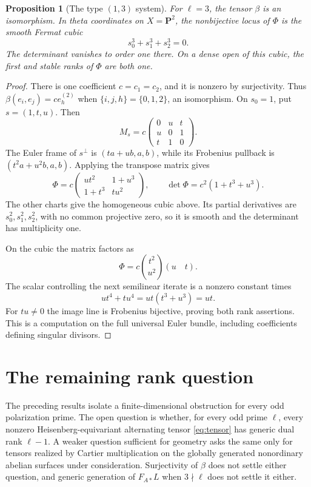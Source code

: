 \documentclass[11pt]{article}
\newtheorem{proposition}[theorem]{Proposition}
\theoremstyle{definition}\newtheorem{definition}[theorem]{Definition}
\theoremstyle{remark}\newtheorem{remark}[theorem]{Remark}
\newcommand{\PP}{\mathbf P}
\begin{document}
\begin{proposition}[The type $(1,3)$ system]\label{prop:cubic}
For $\ell=3$, the tensor $\beta$ is an isomorphism. In theta coordinates on $X=\PP^2$, the nonbijective locus of $\Phi$ is the smooth Fermat cubic
\[
 s_0^3+s_1^3+s_2^3=0.
\]
The determinant vanishes to order one there. On a dense open of this cubic, the first and stable ranks of $\Phi$ are both one.
\end{proposition}
\begin{proof}
There is one coefficient $c=c_1=c_2$, and it is nonzero by surjectivity. Thus $\beta(e_i,e_j)=c e_h^{(2)}$ when $\{i,j,h\}=\{0,1,2\}$, an isomorphism. On $s_0=1$, put $s=(1,t,u)$. Then
\[
 M_s=c\begin{pmatrix}0&u&t\\u&0&1\\t&1&0\end{pmatrix}.
\]
The Euler frame of $s^\perp$ is $(ta+ub,a,b)$, while its Frobenius pullback is $(t^2a+u^2b,a,b)$. Applying the transpose matrix gives
\[
 \Phi=c\begin{pmatrix}ut^2&1+u^3\\1+t^3&tu^2\end{pmatrix},
 \qquad \det\Phi=c^2(1+t^3+u^3).
\]
The other charts give the homogeneous cubic above. Its partial derivatives are $s_0^2,s_1^2,s_2^2$, with no common projective zero, so it is smooth and the determinant has multiplicity one.

On the cubic the matrix factors as
\[
 \Phi=c\binom{t^2}{u^2}(u\quad t).
\]
The scalar controlling the next semilinear iterate is a nonzero constant times
\[
 ut^4+tu^4=ut(t^3+u^3)=ut.
\]
For $tu\ne0$ the image line is Frobenius bijective, proving both rank assertions. This is a computation on the full universal Euler bundle, including coefficients defining singular divisors.
\end{proof}

\section{The remaining rank question}\label{sec:open}

The preceding results isolate a finite-dimensional obstruction for every odd polarization prime. The open question is whether, for every odd prime $\ell$, every nonzero Heisenberg-equivariant alternating tensor \eqref{eq:tensor} has generic dual rank $\ell-1$. A weaker question sufficient for geometry asks the same only for tensors realized by Cartier multiplication on the globally generated nonordinary abelian surfaces under consideration. Surjectivity of $\beta$ does not settle either question, and generic generation of $F_{A*}L$ when $3\nmid\ell$ does not settle it either.
\end{document}
